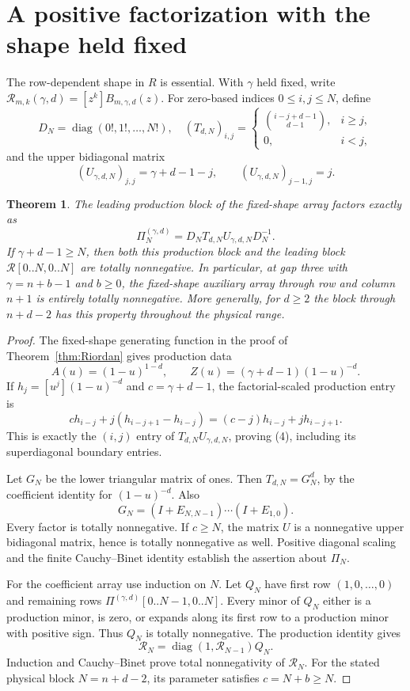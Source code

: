 \documentclass[11pt]{article}
\newtheorem{theorem}{Theorem}
\begin{document}
\section{A positive factorization with the shape held fixed}
The row-dependent shape in $R$ is essential. With $\gamma$ held fixed,
write $\mathcal R_{m,k}(\gamma,d)=[z^k]B_{m,\gamma,d}(z)$.
For zero-based indices $0\le i,j\le N$, define
\[
 D_N=\operatorname{diag}(0!,1!,\ldots,N!),\quad
 (T_{d,N})_{i,j}=\begin{cases}\binom{i-j+d-1}{d-1},&i\ge j,\\0,&i<j,
 \end{cases}
\]
and the upper bidiagonal matrix
\[
 (U_{\gamma,d,N})_{j,j}=\gamma+d-1-j,\qquad
 (U_{\gamma,d,N})_{j-1,j}=j.
\]
\begin{theorem}\label{thm:fixed}
The leading production block of the fixed-shape array factors exactly as
\[
 \Pi^{(\gamma,d)}_N=D_N T_{d,N}U_{\gamma,d,N}D_N^{-1}.          \tag{4}
\]
If $\gamma+d-1\ge N$, then both this production block and the
leading block $\mathcal R[0..N,0..N]$ are totally nonnegative.
In particular, at gap three with $\gamma=n+b-1$ and $b\ge0$,
the fixed-shape auxiliary array through row and column $n+1$ is
entirely totally nonnegative. More generally, for $d\ge2$ the block
through $n+d-2$ has this property throughout the physical range.
\end{theorem}
\begin{proof}
The fixed-shape generating function in the proof of
Theorem~\ref{thm:Riordan} gives production data
\[
 A(u)=(1-u)^{1-d},\qquad Z(u)=(\gamma+d-1)(1-u)^{-d}.
\]
If $h_j=[u^j](1-u)^{-d}$ and $c=\gamma+d-1$, the factorial-scaled
production entry is
\[
 c h_{i-j}+j(h_{i-j+1}-h_{i-j})
      =(c-j)h_{i-j}+j h_{i-j+1}.
\]
This is exactly the $(i,j)$ entry of $T_{d,N}U_{\gamma,d,N}$,
proving (4), including its superdiagonal boundary entries.

Let $G_N$ be the lower triangular matrix of ones. Then
$T_{d,N}=G_N^d$, by the coefficient identity for $(1-u)^{-d}$.
Also
\[
 G_N=(I+E_{N,N-1})\cdots(I+E_{1,0}).
\]
Every factor is totally nonnegative. If $c\ge N$, the matrix $U$
is a nonnegative upper bidiagonal matrix, hence is totally
nonnegative as well. Positive diagonal scaling and the finite
Cauchy--Binet identity establish the assertion about $\Pi_N$.

For the coefficient array use induction on $N$.
Let $Q_N$ have first row $(1,0,\ldots,0)$ and remaining rows
$\Pi^{(\gamma,d)}[0..N-1,0..N]$. Every minor of $Q_N$ either
is a production minor, is zero, or expands along its first row
to a production minor with positive sign. Thus $Q_N$ is totally
nonnegative. The production identity gives
\[
 \mathcal R_N=\operatorname{diag}(1,\mathcal R_{N-1})Q_N.
\]
Induction and Cauchy--Binet prove total nonnegativity of
$\mathcal R_N$. For the stated physical block
$N=n+d-2$, its parameter satisfies $c=N+b\ge N$.
\end{proof}
\end{document}
